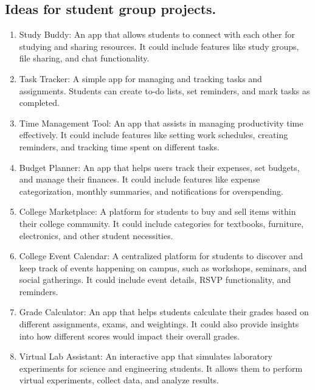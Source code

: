\documentclass[a4paper,12pt]{article}
\begin{document}

\begin{large}

\section*{Ideas for student group projects.}

\begin{enumerate}

\item Study Buddy: An app that allows students to connect with each other for studying and sharing resources. It could include features like study groups, file sharing, and chat functionality.

\item Task Tracker: A simple app for managing and tracking tasks and assignments. Students can create to-do lists, set reminders, and mark tasks as completed.

\item Time Management Tool: An app that assists in managing productivity time effectively. It could include features like setting work schedules, creating reminders, and tracking time spent on different tasks.

\item Budget Planner: An app that helps users track their expenses, set budgets, and manage their finances. It could include features like expense categorization, monthly summaries, and notifications for overspending.

\item College Marketplace: A platform for students to buy and sell items within their college community. It could include categories for textbooks, furniture, electronics, and other student necessities.

\item College Event Calendar: A centralized platform for students to discover and keep track of events happening on campus, such as workshops, seminars, and social gatherings. It could include event details, RSVP functionality, and reminders.

\item Grade Calculator: An app that helps students calculate their grades based on different assignments, exams, and weightings. It could also provide insights into how different scores would impact their overall grades.

\item Virtual Lab Assistant: An interactive app that simulates laboratory experiments for science and engineering students. It allows them to perform virtual experiments, collect data, and analyze results.


\end{enumerate}
\end{large}
\end{document}
